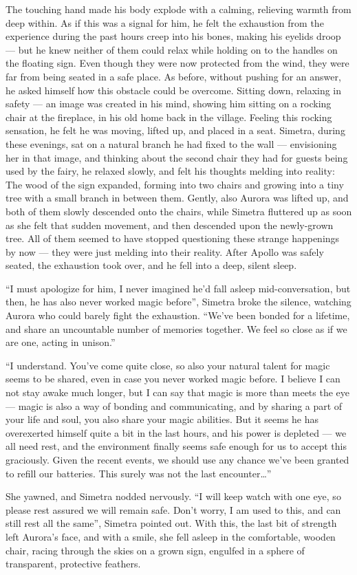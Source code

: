 The touching hand made his body explode with a calming, relieving warmth from deep within. As if this was a signal for him, he felt the exhaustion from the experience during the past hours creep into his bones, making his eyelids droop --- but he knew neither of them could relax while holding on to the handles on the floating sign. Even though they were now protected from the wind, they were far from being seated in a safe place.
As before, without pushing for an answer, he asked himself how this obstacle could be overcome. Sitting down, relaxing in safety --- an image was created in his mind, showing him sitting on a rocking chair at the fireplace, in his old home back in the village. Feeling this rocking sensation, he felt he was moving, lifted up, and placed in a seat. Simetra, during these evenings, sat on a natural branch he had fixed to the wall --- envisioning her in that image, and thinking about the second chair they had for guests being used by the fairy, he relaxed slowly, and felt his thoughts melding into reality: The wood of the sign expanded, forming into two chairs and growing into a tiny tree with a small branch in between them. Gently, also Aurora was lifted up, and both of them slowly descended onto the chairs, while Simetra fluttered up as soon as she felt that sudden movement, and then descended upon the newly-grown tree. All of them seemed to have stopped questioning these strange happenings by now --- they were just melding into their reality. After Apollo was safely seated, the exhaustion took over, and he fell into a deep, silent sleep.

\enquote{I must apologize for him, I never imagined he'd fall asleep mid-conversation, but then, he has also never worked magic before}, Simetra broke the silence, watching Aurora who could barely fight the exhaustion. \enquote{We've been bonded for a lifetime, and share an uncountable number of memories together. We feel so close as if we are one, acting in unison.}

\enquote{I understand. You've come quite close, so also your natural talent for magic seems to be shared, even in case you never worked magic before. I believe I can not stay awake much longer, but I can say that magic is more than meets the eye --- magic is also a way of bonding and communicating, and by sharing a part of your life and soul, you also share your magic abilities. But it seems he has overexerted himself quite a bit in the last hours, and his power is depleted --- we all need rest, and the environment finally seems safe enough for us to accept this graciously. Given the recent events, we should use any chance we've been granted to refill our batteries. This surely was not the last encounter\dots{}}

She yawned, and Simetra nodded nervously. \enquote{I will keep watch with one eye, so please rest assured we will remain safe. Don't worry, I am used to this, and can still rest all the same}, Simetra pointed out. With this, the last bit of strength left Aurora's face, and with a smile, she fell asleep in the comfortable, wooden chair, racing through the skies on a grown sign, engulfed in a sphere of transparent, protective feathers.
